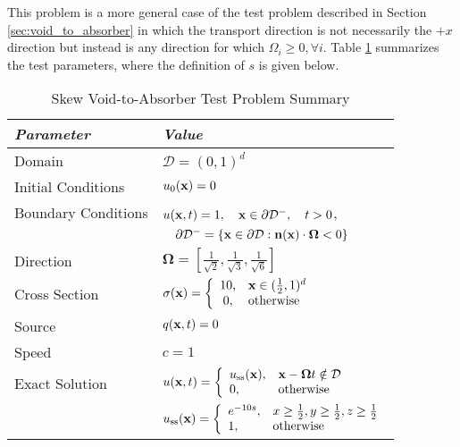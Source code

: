 This problem is a more general case of the test problem described in
Section \ref{sec:void_to_absorber} in which the transport direction is
not necessarily the $+x$ direction but instead is any direction for which
$\Omega_i\ge 0,\forall i$.
Table \ref{tab:void_to_absorber_skew} summarizes the test parameters,
where the definition of $s$ is given below.

\begin{table}[htb]\caption{Skew Void-to-Absorber Test Problem Summary}
\label{tab:void_to_absorber_skew}
\centering
\begin{tabular}{l l}\toprule
\emph{Parameter} & \emph{Value}\\\midrule
Domain & $\mathcal{D} = (0,1)^d$\\
Initial Conditions & $u_0(\mathbf{x})=0$\\
Boundary Conditions & $u(\mathbf{x},t)=1,\quad \mathbf{x}\in\partial\mathcal{D}^-,\quad t>0$,\\
   & $\quad\partial\mathcal{D}^-=\{\mathbf{x}\in\partial\mathcal{D}:\mathbf{n}(\mathbf{x})
       \cdot\mathbf{\Omega}<0\}$\\
Direction & $\mathbf{\Omega} = \left[\frac{1}{\sqrt{2}},\frac{1}{\sqrt{3}},
   \frac{1}{\sqrt{6}}\right]$\\
Cross Section & $\sigma(\mathbf{x})=\left\{\begin{array}{c l}
   10, & \mathbf{x}\in(\frac{1}{2},1)^d\\
   0,  & \mbox{otherwise}\end{array}\right.$\\
Source & $q(\mathbf{x},t)=0$\\
Speed & $c=1$\\
Exact Solution & $u(\mathbf{x},t)=\left\{\begin{array}{l l}
   u_{\text{ss}}(\mathbf{x}), & \mathbf{x}-\mathbf{\Omega}t\notin\mathcal{D}\\
   0, & \mbox{otherwise}
   \end{array}\right.$ \\
   & $u_{\text{ss}}(\mathbf{x}) =
       \left\{\begin{array}{l l}
         e^{-10s}, & x\ge\frac{1}{2}, y\ge\frac{1}{2}, z\ge\frac{1}{2}\\
         1,        & \mbox{otherwise}
       \end{array}\right.$\\
\bottomrule\end{tabular}
\end{table}

